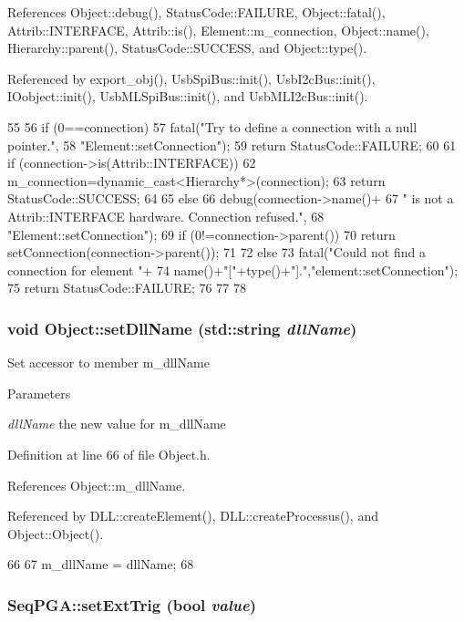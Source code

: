 References Object::debug(), StatusCode::FAILURE, Object::fatal(), Attrib::INTERFACE, Attrib::is(), Element::m\_\-connection, Object::name(), Hierarchy::parent(), StatusCode::SUCCESS, and Object::type().

Referenced by export\_\-obj(), UsbSpiBus::init(), UsbI2cBus::init(), IOobject::init(), UsbMLSpiBus::init(), and UsbMLI2cBus::init().


\begin{DoxyCode}
55                                                       {
56   if (0==connection){
57     fatal("Try to define a connection with a null pointer.",
58         "Element::setConnection");
59     return StatusCode::FAILURE;
60   }
61   if (connection->is(Attrib::INTERFACE)){
62     m_connection=dynamic_cast<Hierarchy*>(connection);
63     return StatusCode::SUCCESS;
64   }
65   else {
66     debug(connection->name()+
67         " is not a Attrib::INTERFACE hardware. Connection refused.",
68         "Element::setConnection");
69     if (0!=connection->parent()){
70       return setConnection(connection->parent());
71     }
72     else{
73       fatal("Could not find a connection for element "+
74           name()+"["+type()+"].","element::setConnection");
75       return StatusCode::FAILURE;
76     }
77   }
78 }
\end{DoxyCode}
\hypertarget{classObject_a870c5af919958c2136623b2d7816d123}{
\subsubsection[{setDllName}]{\setlength{\rightskip}{0pt plus 5cm}void Object::setDllName (std::string {\em dllName})}}
\label{classObject_a870c5af919958c2136623b2d7816d123}
Set accessor to member m\_\-dllName 
\begin{DoxyParams}{Parameters}
\item[{\em dllName}]the new value for m\_\-dllName \end{DoxyParams}


Definition at line 66 of file Object.h.

References Object::m\_\-dllName.

Referenced by DLL::createElement(), DLL::createProcessus(), and Object::Object().


\begin{DoxyCode}
66                                       {
67     m_dllName = dllName;
68   }
\end{DoxyCode}
\hypertarget{classSeqPGA_a9744b6cff04738474556cc2153af19de}{
\subsubsection[{setExtTrig}]{ SeqPGA::setExtTrig (bool {\em value})}}
\label{classSeqPGA_a9744b6cff04738474556cc2153af19de}



